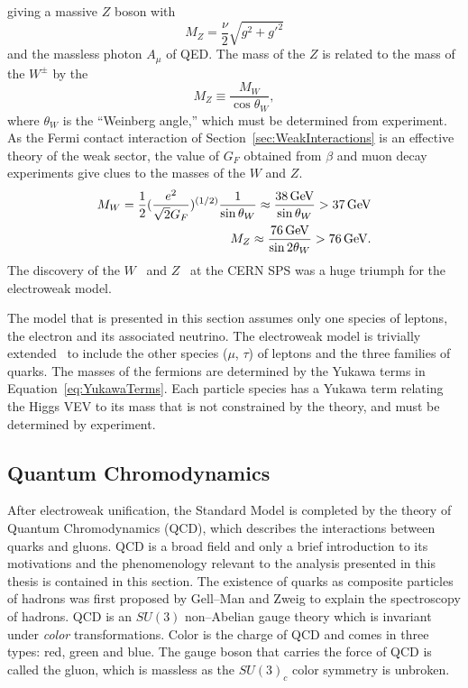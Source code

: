 giving a massive $Z$ boson with 
\begin{equation}
  M_Z = \frac{\nu}{2}\sqrt{g^2 + g'^2} 
  \label{eq:ZBosonMass}
\end{equation}
and the massless photon $A_\mu$ of QED\@.  The mass of the $Z$ is related to the
mass of the $W^\pm$ by the 
\begin{equation}
  M_Z \equiv \frac{M_W}{\cos \theta_W},
\end{equation}
where $\theta_W$ is the ``Weinberg angle,'' which must be determined from
experiment.  As the Fermi contact interaction of
Section~\ref{sec:WeakInteractions} is an effective theory of the weak sector,
the value of $G_F$ obtained from $\beta$ and muon decay experiments give clues
to the masses of the $W$ and $Z$.  
\begin{eqnarray}
  M_W = \frac{1}{2}(\frac{e^2}{\sqrt 2 G_F})^{(1/2)}\frac{1}{\sin\theta_W} \approx
  \frac{38 \,\text{Ge\hspace{-.08em}V}}{\sin\theta_W} > 37 \,\text{Ge\hspace{-.08em}V} \\ 
  M_Z \approx \frac{76 \,\text{Ge\hspace{-.08em}V}}{\sin
  2\theta_W} > 76\,\text{Ge\hspace{-.08em}V}.
\end{eqnarray}
The discovery of the $W$~\cite{UA1WDiscovery,UA2WDiscovery} and
$Z$~\cite{UA1ZDiscovery, UA2ZDiscovery} at the CERN SPS was a huge triumph for
the electroweak model.

The model that is presented in this section assumes only one species of leptons,
the electron and its associated neutrino.  The electroweak model is trivially
extended~\cite{Morii:SMandBSM} to include the other species ($\mu$, $\tau$) of
leptons and the three families of quarks. The masses of the fermions are
determined by the Yukawa terms in Equation~\ref{eq:YukawaTerms}.  Each particle
species has a Yukawa term relating the Higgs VEV to its mass that is not
constrained by the theory, and must be determined by experiment.

\subsection{Quantum Chromodynamics}

After electroweak unification, the Standard Model is completed by the theory of
Quantum Chromodynamics (QCD), which describes the interactions between quarks
and gluons.  QCD is a broad field and only a brief introduction to its
motivations and the phenomenology relevant to the analysis presented in this
thesis is contained in this section.  The existence of quarks as composite
particles of hadrons was first proposed by Gell--Man and Zweig to explain the
spectroscopy of hadrons.  QCD is an $SU(3)$ non--Abelian gauge theory which is
invariant under \emph{color} transformations.  Color is the charge of QCD and
comes in three types: red, green and blue.  The gauge boson that carries the
force of QCD is called the gluon, which is massless as the $SU(3)_c$ color
symmetry is unbroken.

